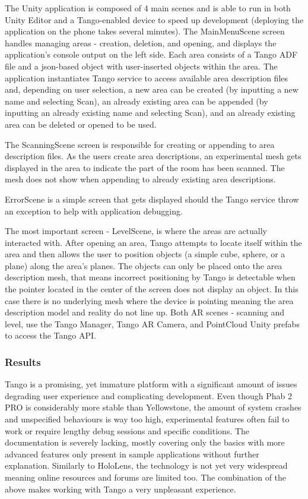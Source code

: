 \documentclass[12pt, a4paper]{article}
\begin{document}
The Unity application is composed of 4 main scenes and is able to run in both Unity Editor and a Tango-enabled device to speed up development (deploying the application on the phone takes several minutes). The MainMenuScene screen handles managing areas - creation, deletion, and opening, and displays the application’s console output on the left side. Each area consists of a Tango ADF file and a json-based object with user-inserted objects within the area. The application instantiates Tango service to access available area description files and, depending on user selection, a new area can be created (by inputting a new name and selecting Scan), an already existing area can be appended (by inputting an already existing name and selecting Scan), and an already existing area can be deleted or opened to be used.

The ScanningScene screen is responsible for creating or appending to area description files. As the users create area descriptions, an experimental mesh gets displayed in the area to indicate the part of the room has been scanned. The mesh does not show when appending to already existing area descriptions.

ErrorScene is a simple screen that gets displayed should the Tango service throw an exception to help with application debugging.

The most important screen - LevelScene, is where the areas are actually interacted with. After opening an area, Tango attempts to locate itself within the area and then allows the user to position objects (a simple cube, sphere, or a plane) along the area’s planes. The objects can only be placed onto the area description mesh, that means incorrect positioning by Tango is detectable when the pointer located in the center of the screen does not display an object. In this case there is no underlying mesh where the device is pointing meaning the area description model and reality do not line up. Both AR scenes - scanning and level, use the Tango Manager, Tango AR Camera, and PointCloud Unity prefabs to access the Tango API.

\subsubsection{Results}
Tango is a promising, yet immature platform with a significant amount of issues degrading user experience and complicating development. Even though Phab 2 PRO is considerably more stable than Yellowstone, the amount of system crashes and unspecified behaviours is way too high, experimental features often fail to work or require lengthy debug sessions and specific conditions. The documentation is severely lacking, mostly covering only the basics with more advanced features only present in sample applications without further explanation. Similarly to HoloLens, the technology is not yet very widespread meaning online resources and forums are limited too. The combination of the above makes working with Tango a very unpleasant experience.
\end{document}
